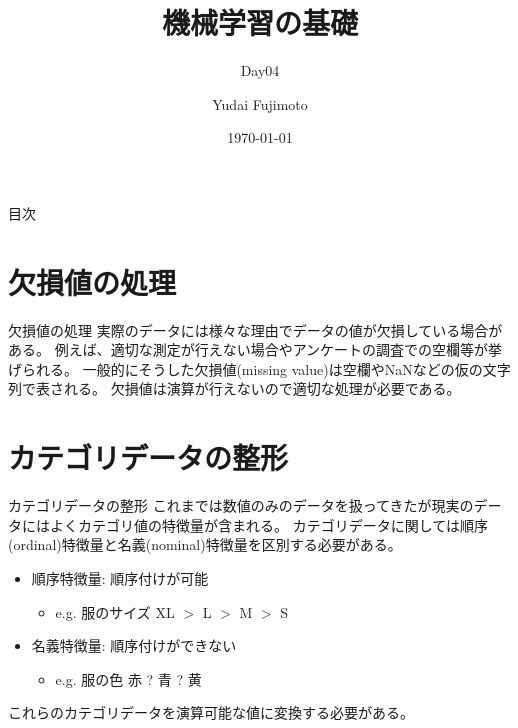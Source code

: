 \documentclass[aspectratio=169, dvipdfmx, 11pt]{beamer} %
\title[Day04]{機械学習の基礎}
\subtitle{Day04}
\author[Yudai Fujimoto]{Yudai Fujimoto}
\institute[SUS]{Suwa University of Science}
\date{\today}
\begin{document}
\maketitle

\begin{frame}{目次}
    \tableofcontents
\end{frame}

\section{欠損値の処理}
\begin{frame}{欠損値の処理}
    実際のデータには様々な理由でデータの値が欠損している場合がある。
    例えば、適切な測定が行えない場合やアンケートの調査での空欄等が挙げられる。
    一般的にそうした欠損値(missing value)は空欄やNaNなどの仮の文字列で表される。
    欠損値は演算が行えないので適切な処理が必要である。
\end{frame}

\section{カテゴリデータの整形}
\begin{frame}{カテゴリデータの整形}
    これまでは数値のみのデータを扱ってきたが現実のデータにはよくカテゴリ値の特徴量が含まれる。
    カテゴリデータに関しては順序(ordinal)特徴量と名義(nominal)特徴量を区別する必要がある。
    \vspace{1em}
    \begin{itemize}
        \item 順序特徴量: 順序付けが可能
        \begin{itemize}
            \item e.g. 服のサイズ XL \(>\) L \(>\) M \(>\) S
        \end{itemize}
        \item 名義特徴量: 順序付けができない
        \begin{itemize}
            \item e.g. 服の色 赤 ? 青 ? 黄
        \end{itemize}
    \end{itemize}
    \vspace{1em}
    これらのカテゴリデータを演算可能な値に変換する必要がある。
\end{frame}
\end{document}
